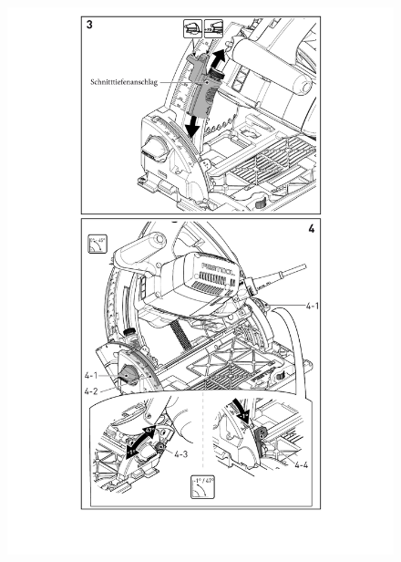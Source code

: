 \documentclass{\basedir/fablab-document}
\begin{document}
\begin{figure}[H]
	\centering
	\includegraphics[width=1\textwidth]{img/festool_bilder_1Teil2.pdf}
	\caption{}
	\label{fig:gehaeuse_oben}
\end{figure}
\end{document}
